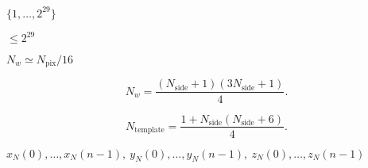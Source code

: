 \documentclass[12pt,twoside]{article}
\providecommand{\facname}{}%
\providecommand{\FACNAME}{}%
\providecommand{\projfullname}{}
\def\lthtmlcheckvsize{\ifdim\ht\sizebox<\vsize 
  \ifdim\wd\sizebox<\hsize\expandafter\hfill\fi \expandafter\vfill
  \else\expandafter\vss\fi}%
\begin{document}
\renewcommand{\facname}{{neighbours\_ring }}

\renewcommand{\facname}{{npix2nside }}

\renewcommand{\FACNAME}{{NPIX2NSIDE }}
{\newpage\clearpage
{}%
$\{1,\ldots,2^{29}\}$%
\lthtmlindisplaymathZ
\lthtmlcheckvsize\clearpage}


\renewcommand{\facname}{{nside2npix}}

\renewcommand{\FACNAME}{{NSIDE2NPIX }}
{\newpage\clearpage
{}%
$ \le 2^{29}$%
\lthtmlindisplaymathZ
\lthtmlcheckvsize\clearpage}


\renewcommand{\facname}{{nside2npweights }}

\renewcommand{\FACNAME}{{NSIDE2NPWEIGHTS }}
{\newpage\clearpage
{}%
$N_w  \simeq N_{\mathrm{pix}}/16$%
\lthtmlindisplaymathZ
\lthtmlcheckvsize\clearpage}

{\newpage\clearpage
{}%
\begin{displaymath}N_w=\frac{(N_{\mathrm{side}}+1)(3N_{\mathrm{side}}+1)}{4}.\end{displaymath}%
\lthtmldisplayZ
\lthtmlcheckvsize\clearpage}


\renewcommand{\facname}{{nside2ntemplates }}

\renewcommand{\FACNAME}{{NSIDE2NTEMPLATES }}
{\newpage\clearpage
{}%
\begin{displaymath}N_{\mathrm{template}}=\frac{1+N_{\mathrm{side}}(N_{\mathrm{side}}+6)}{4}.\end{displaymath}%
\lthtmldisplayZ
\lthtmlcheckvsize\clearpage}


\renewcommand{\projfullname}{{an orthographic}}

\renewcommand{\facname}{{pix2xxx, ang2xxx,... }}

\renewcommand{\FACNAME}{{PIX2XXX, ANG2XXX,...}}
{\newpage\clearpage
{}%
$x_N(0),\ldots,x_N(n-1),\ y_N(0),\ldots,y_N(n-1),\ z_N(0),\ldots,z_N(n-1)$%
\lthtmlindisplaymathZ
\lthtmlcheckvsize\clearpage}
\end{document}
